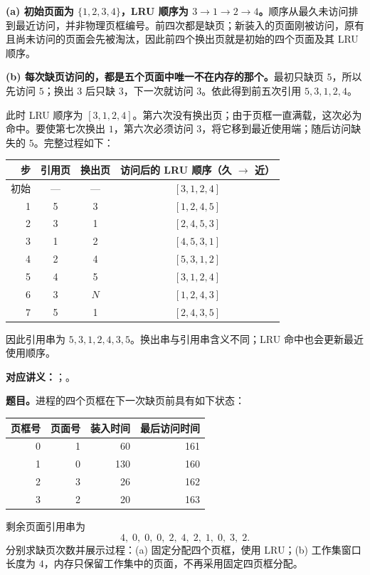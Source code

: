 \begin{checkedsolution}
\textbf{(a) 初始页面为 $\{1,2,3,4\}$，LRU 顺序为 $3\to1\to2\to4$。}顺序从最久未访问排到最近访问，并非物理页框编号。前四次都是缺页；新装入的页面刚被访问，原有且尚未访问的页面会先被淘汰，因此前四个换出页就是初始的四个页面及其 LRU 顺序。

\textbf{(b) 每次缺页访问的，都是五个页面中唯一不在内存的那个。}最初只缺页 $5$，所以先访问 $5$；换出 $3$ 后只缺 $3$，下一次就访问 $3$。依此得到前五次引用 $5,3,1,2,4$。

此时 LRU 顺序为 $[3,1,2,4]$。第六次没有换出页；由于页框一直满载，这次必为命中。要使第七次换出 $1$，第六次必须访问 $3$，将它移到最近使用端；随后访问缺失的 $5$。完整过程如下：

\begin{center}
\begin{tabular}{@{}rccc@{}}
\toprule
步 & 引用页 & 换出页 & 访问后的 LRU 顺序（久 $\to$ 近） \\
\midrule
初始 & --- & --- & $[3,1,2,4]$ \\
1 & 5 & 3 & $[1,2,4,5]$ \\
2 & 3 & 1 & $[2,4,5,3]$ \\
3 & 1 & 2 & $[4,5,3,1]$ \\
4 & 2 & 4 & $[5,3,1,2]$ \\
5 & 4 & 5 & $[3,1,2,4]$ \\
6 & 3 & $N$ & $[1,2,4,3]$ \\
7 & 5 & 1 & $[2,4,3,5]$ \\
\bottomrule
\end{tabular}
\end{center}
因此引用串为 $\boxed{5,3,1,2,4,3,5}$。换出串与引用串含义不同；LRU 命中也会更新最近使用顺序。
\end{checkedsolution}

\begin{samepage}

\textbf{对应讲义：}；。

\textbf{题目。}进程的四个页框在下一次缺页前具有如下状态：\par
\end{samepage}

\begin{center}
\begin{tabular}{@{}rrrr@{}}
\toprule
页框号 & 页面号 & 装入时间 & 最后访问时间 \\
\midrule
0 & 1 & 60 & 161 \\
1 & 0 & 130 & 160 \\
2 & 3 & 26 & 162 \\
3 & 2 & 20 & 163 \\
\bottomrule
\end{tabular}
\end{center}
剩余页面引用串为
\[
  4,\;0,\;0,\;0,\;2,\;4,\;2,\;1,\;0,\;3,\;2.
\]
分别求缺页次数并展示过程：(a) 固定分配四个页框，使用 LRU；(b) 工作集窗口长度为 $4$，内存只保留工作集中的页面，不再采用固定四页框分配。


